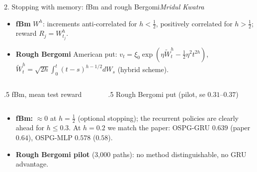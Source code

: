 \documentclass[aspectratio=169,11pt]{beamer}
\newcommand{\by}[1]{\hfill{\normalfont\small\itshape #1}}
\begin{document}
\begin{frame}{2. Stopping with memory: fBm and rough Bergomi\by{Mridul Kwatra}}
\small
\begin{itemize}
\item \textbf{fBm} $W^h$: increments anti-correlated for $h<\frac12$, positively correlated for
  $h>\frac12$; reward $R_j=W^h_{t_j}$.
\item \textbf{Rough Bergomi} American put: $v_t=\xi_0\exp(\eta\widetilde W^h_t-\frac12\eta^2t^{2h})$,
  $\widetilde W^h_t=\sqrt{2h}\int_0^t(t-s)^{h-1/2}dW_s$ (hybrid scheme).
\end{itemize}
\vspace{2pt}
\begin{columns}[T]
\begin{column}{.5\textwidth}\centering\scriptsize
fBm, mean test reward\\[2pt]
\resizebox{.95\linewidth}{!}{}
\end{column}
\begin{column}{.5\textwidth}\centering\scriptsize
Rough Bergomi put (pilot, se $0.31$--$0.37$)\\[2pt]
\resizebox{.95\linewidth}{!}{}
\end{column}
\end{columns}
\vspace{4pt}
\begin{itemize}
\item \textbf{fBm:} $\approx0$ at $h=\frac12$ (optional stopping); the recurrent policies are clearly
  ahead for $h\le0.3$. At $h=0.2$ we match the paper: OSPG-GRU $0.639$ (paper $0.64$), OSPG-MLP
  $0.578$ ($0.58$).
\item \textbf{Rough Bergomi pilot} (3{,}000 paths): no method distinguishable, no GRU advantage.
\end{itemize}
\end{frame}
\end{document}

